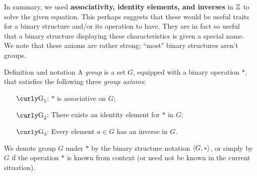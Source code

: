 In summary, we used \textbf{associativity, identity elements, and
inverses} in $\mathbb{Z}$ to solve the given equation. This perhaps
suggests that these would be useful traits for a binary
structure and/or its operation to have.  They are in fact so
useful that a binary structure displaying these characteristics
is given a special name. We note that these axioms are rather
strong; ``most" binary structures aren't groups.

\begin{df}{Definition and notation} A \textit{group} is a set $G$, equipped with a binary
operation $*$, that satisfies the following three \textit{group
axioms}:
\begin{enumerate}
\item[$\G_1$:] $*$ is associative on $G$;
\item[$\G_2$:] There exists an identity element for $*$ in $G$;
\item[$\G_3$:] Every element $a\in G$ has an inverse in $G$.
\end{enumerate}
\noindent We
    denote group $G$ under $*$ by the binary structure notation
    $\langle G,*\rangle$, or simply by $G$ if the operation $*$ is known
    from context (or need not be known in the current
    situation).\end{df}



